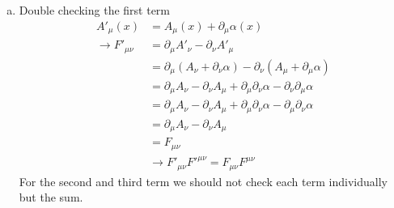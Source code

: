 \documentclass[../main.tex]{subfiles}
\begin{document}
\begin{enumerate}[(a)]
\item Double checking the first term
\begin{align}
A'_\mu(x)
&=A_\mu(x)+\partial_\mu\alpha(x)\\
\rightarrow F'_{\mu\nu}
&=\partial_\mu A'_\nu-\partial_\nu A'_\mu\\
&=\partial_\mu (A_\nu+\partial_\nu\alpha)-\partial_\nu (A_\mu+\partial_\mu\alpha)\\
&=\partial_\mu A_\nu-\partial_\nu A_\mu+\partial_\mu\partial_\nu\alpha-\partial_\nu\partial_\mu\alpha\\
&=\partial_\mu A_\nu-\partial_\nu A_\mu+\partial_\mu\partial_\nu\alpha-\partial_\mu\partial_\nu\alpha\\
&=\partial_\mu A_\nu-\partial_\nu A_\mu\\
&=F_{\mu\nu}\\
&\rightarrow F'_{\mu\nu}F'^{\mu\nu}=F_{\mu\nu}F^{\mu\nu}
\end{align}
For the second and third term we should not check each term individually but the sum.


\end{enumerate}
\end{document}
